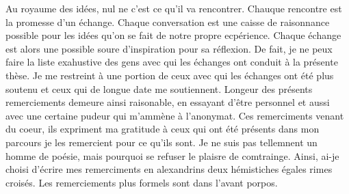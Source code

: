 

\Pagetitre
\cleardoublepage






\remerciements
{}

Au royaume des idées, nul ne c'est ce qu'il va rencontrer. Chauque rencontre est la promesse d'un échange. Chaque conversation est une caisse de raisonnance possible pour les idées qu'on se fait de notre propre ecpérience. Chaque échange est alors une possible soure d'inspiration pour sa réflexion. De fait, je ne peux faire la liste exahustive des gens avec qui les échanges ont conduit à la présente thèse. Je me restreint à une portion de ceux avec qui les échanges ont été plus soutenu et ceux qui de longue date me soutiennent. Longeur des présents remerciements demeure ainsi raisonable, en essayant d'être personnel et aussi avec une certaine pudeur qui m'ammène à l'anonymat. Ces remerciments venant du coeur, ils expriment ma gratitude à ceux qui ont été présents dans mon parcours je les remercient pour ce qu'ils sont.
Je ne suis pas tellemnent un homme de poésie, mais pourquoi se refuser le plaisre de comtrainge. Ainsi, ai-je choisi d'écrire mes remerciments en alexandrins deux hémistiches égales rimes croisés. Les remerciements plus formels sont dans l'avant porpos.





